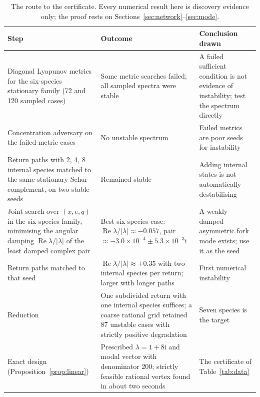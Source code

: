 \documentclass[11pt,a4paper]{article}
\theoremstyle{plain}
\theoremstyle{definition}
\theoremstyle{remark}
\numberwithin{equation}{section}
\renewcommand{\Re}{\operatorname{Re}}
\newcommand{\iu}{\mathrm{i}}
\begin{document}
\begin{table}[htbp]
\centering\small
\begin{tabular}{@{}>{\raggedright\arraybackslash}p{.30\linewidth}>{\raggedright\arraybackslash}p{.33\linewidth}>{\raggedright\arraybackslash}p{.30\linewidth}@{}}
\toprule
Step & Outcome & Conclusion drawn\\
\midrule
Diagonal Lyapunov metrics for the six-species stationary family (72 and 120 sampled cases) & Some metric searches failed; all sampled spectra were stable & A failed sufficient condition is not evidence of instability; test the spectrum directly\\
Concentration adversary on the failed-metric cases & No unstable spectrum & Failed metrics are poor seeds for instability\\
Return paths with 2, 4, 8 internal species matched to the same stationary Schur complement, on two stable seeds & Remained stable & Adding internal states is not automatically destabilising\\
Joint search over $(x,e,q)$ in the six-species family, minimising the angular damping $\Re\lambda/|\lambda|$ of the least damped complex pair & Best six-species case: $\Re\lambda/|\lambda|\approx-0.057$, pair $\approx-3.0\times10^{-4}\pm5.3\times10^{-3}\iu$ & A weakly damped asymmetric fork mode exists; use it as the seed\\
Return paths matched to that seed & $\Re\lambda/|\lambda|\approx+0.35$ with two internal species per return; larger with longer paths & First numerical instability\\
Reduction & One subdivided return with one internal species suffices; a coarse rational grid retained 87 unstable cases with strictly positive degradation & Seven species is the target\\
Exact design (Proposition~\ref{prop:linear}) & Prescribed $\lambda=1+8\iu$ and modal vector with denominator 200; strictly feasible rational vertex found in about two seconds & The certificate of Table~\ref{tab:data}\\
\bottomrule
\end{tabular}
\caption{The route to the certificate. Every numerical result here is discovery evidence only; the proof rests on Sections~\ref{sec:network}--\ref{sec:mode}.}
\label{tab:search}
\end{table}
\end{document}
